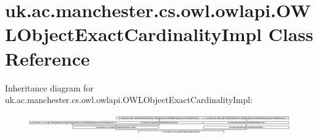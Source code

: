 \hypertarget{classuk_1_1ac_1_1manchester_1_1cs_1_1owl_1_1owlapi_1_1_o_w_l_object_exact_cardinality_impl}{\section{uk.\-ac.\-manchester.\-cs.\-owl.\-owlapi.\-O\-W\-L\-Object\-Exact\-Cardinality\-Impl Class Reference}
\label{classuk_1_1ac_1_1manchester_1_1cs_1_1owl_1_1owlapi_1_1_o_w_l_object_exact_cardinality_impl}
}
Inheritance diagram for uk.\-ac.\-manchester.\-cs.\-owl.\-owlapi.\-O\-W\-L\-Object\-Exact\-Cardinality\-Impl\-:\begin{figure}[H]
\begin{center}
\leavevmode
\includegraphics[height=0.882585cm]{classuk_1_1ac_1_1manchester_1_1cs_1_1owl_1_1owlapi_1_1_o_w_l_object_exact_cardinality_impl}
\end{center}
\end{figure}

